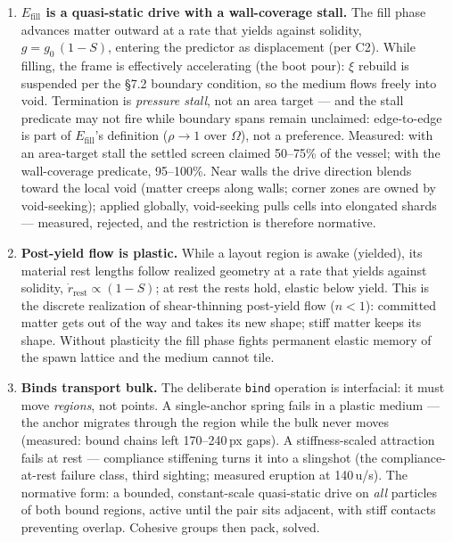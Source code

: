 \documentclass[11pt]{article}
\begin{document}
\begin{enumerate}[leftmargin=2.2em,label=\textbf{C\arabic*.},start=5]

\item \textbf{$E_{\text{fill}}$ is a quasi-static drive with a wall-coverage
stall.} The fill phase advances matter outward at a rate that yields against
solidity, $g = g_0\,(1-S)$, entering the predictor as displacement (per C2).
While filling, the frame is effectively accelerating (the boot pour): $\xi$
rebuild is suspended per the \S7.2 boundary condition, so the medium flows
freely into void. Termination is \emph{pressure stall}, not an area target ---
and the stall predicate may not fire while boundary spans remain unclaimed:
edge-to-edge is part of $E_{\text{fill}}$'s definition
($\rho\!\to\!1$ over $\Omega$), not a preference. Measured: with an area-target
stall the settled screen claimed 50--75\% of the vessel; with the wall-coverage
predicate, 95--100\%. Near walls the drive direction blends toward the local
void (matter creeps along walls; corner zones are owned by void-seeking);
applied globally, void-seeking pulls cells into elongated shards --- measured,
rejected, and the restriction is therefore normative.

\item \textbf{Post-yield flow is plastic.} While a layout region is awake
(yielded), its material rest lengths follow realized geometry at a rate that
yields against solidity, $\dot r_{\text{rest}} \propto (1-S)$; at rest the
rests hold, elastic below yield. This is the discrete realization of
shear-thinning post-yield flow ($n{<}1$): committed matter gets out of the way
and takes its new shape; stiff matter keeps its shape. Without plasticity the
fill phase fights permanent elastic memory of the spawn lattice and the medium
cannot tile.

\item \textbf{Binds transport bulk.} The deliberate \texttt{bind} operation is
interfacial: it must move \emph{regions}, not points. A single-anchor spring
fails in a plastic medium --- the anchor migrates through the region while the
bulk never moves (measured: bound chains left 170--240\,px gaps). A
stiffness-scaled attraction fails at rest --- compliance stiffening turns it
into a slingshot (the compliance-at-rest failure class, third sighting;
measured eruption at 140\,u/s). The normative form: a bounded, constant-scale
quasi-static drive on \emph{all} particles of both bound regions, active until
the pair sits adjacent, with stiff contacts preventing overlap. Cohesive
groups then pack, solved.


\end{enumerate}
\end{document}

